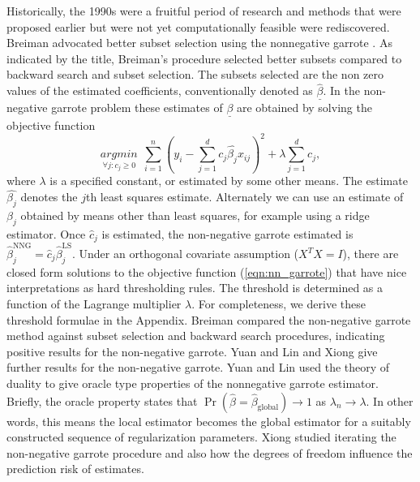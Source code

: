 Historically, the 1990s were a fruitful period of research and methods that were proposed earlier but were not yet computationally feasible were rediscovered. Breiman advocated better subset selection using the nonnegative garrote \cite{breiman1995better,yuan2007non}. As indicated by the title, Breiman's procedure \cite{breiman1995better} selected better subsets compared to backward search and subset selection. The subsets selected are the non zero values of the estimated coefficients, conventionally denoted as $\underline{\hat{\beta}}$. In the non-negative garrote problem these estimates of $\underline{\beta}$ are obtained by solving the objective function 
\begin{equation}\label{eqn:nn_garrote}
\underset{\forall j: c_j\geq 0}{argmin}\ \ \sum_{i=1}^n(y_i -\sum_{j=1}^dc_j\hat{\beta_j}x_{ij})^2 + \lambda\sum_{j=1}^dc_j,
\end{equation}    
where $\lambda$ is a specified constant, or estimated by some other means. The estimate $\hat{\beta_j}$ denotes the $j$th least squares estimate. Alternately we can use an estimate of $\beta_j$ obtained by means other than least squares, for example using a ridge estimator. Once $\hat{c}_j$ is estimated, the non-negative garrote estimated is $\hat{\beta}_j^{\text{NNG}} =\hat{c}_j\hat{\beta}_j^{\text{LS}}$. Under an orthogonal covariate assumption ($X^TX=I$), there are closed form solutions to the objective function (\ref{eqn:nn_garrote}) that have nice interpretations as hard thresholding rules. The threshold is determined as a function of the Lagrange multiplier $\lambda$. For completeness, we derive these threshold formulae in the Appendix. 
Breiman compared the non-negative garrote method against subset selection and backward search procedures, indicating positive results for the non-negative garrote. Yuan and Lin \cite{yuan2007non} and Xiong \cite{xiong2010some} give further results for the non-negative garrote. Yuan and Lin used the theory of duality to give oracle type properties of the nonnegative garrote estimator. Briefly, the oracle property states that $\Pr(\hat{\beta} = \hat{\beta}_{\text{global}})\to 1$ as $\lambda_n\to\lambda$. In other words, this means the local estimator becomes the global estimator for a suitably constructed sequence of regularization parameters. Xiong studied iterating the non-negative garrote procedure and also how the degrees of freedom influence the prediction risk of estimates.    


